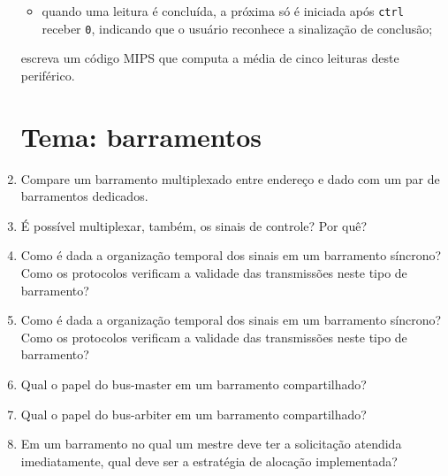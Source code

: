\documentclass{article}
\begin{document}
\begin{enumerate}
\begin{itemize}
    \item quando uma leitura é concluída, a próxima só é iniciada após \texttt{ctrl} receber \texttt{0}, indicando que o usuário reconhece a sinalização de conclusão;
\end{itemize}
escreva um código MIPS que computa a média de cinco leituras deste periférico.

\section*{Tema: barramentos}

\item Compare um barramento multiplexado entre endereço e dado com um par de barramentos dedicados.

\item É possível multiplexar, também, os sinais de controle? Por quê?

\item Como é dada a organização temporal dos sinais em um barramento síncrono? Como os protocolos verificam a validade das transmissões neste tipo de barramento?

\item Como é dada a organização temporal dos sinais em um barramento síncrono? Como os protocolos verificam a validade das transmissões neste tipo de barramento?

\item Qual o papel do bus-master em um barramento compartilhado?

\item Qual o papel do bus-arbiter em um barramento compartilhado?

\item Em um barramento no qual um mestre deve ter a solicitação atendida imediatamente, qual deve ser a estratégia de alocação implementada?

\end{enumerate}
\end{document}
